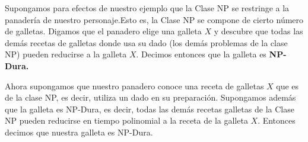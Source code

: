 \documentclass[11 pt, a4paper]{article}
\theoremstyle{definition}
\begin{document}
\begin{enumerate}

            Supongamos para efectos de nuestro ejemplo que la Clase NP se restringe a la panader\'ia de nuestro personaje.Esto es, la Clase NP se compone de cierto n\'umero de galletas. Digamos que el panadero elige una galleta $X$ y descubre que todas las dem\'as recetas de galletas donde usa su dado (los dem\'as problemas de la clase NP) pueden reducirse a la galleta $X$. Decimos entonces que la galleta es \textbf{NP-Dura.}


            Ahora supongamos que nuestro panadero conoce una receta de galletas $X$ que es de la clase NP, es decir, utiliza un dado en su preparaci\'on. Supongamos adem\'as que la galleta es NP-Dura, es decir, todas las dem\'as recetas galletas de la Clase NP pueden reducirse en tiempo polinomial a la receta de la galleta $X$. Entonces decimos que nuestra galleta es NP-Dura.


\end{enumerate}
\end{document}
